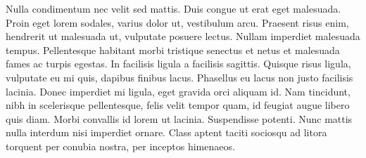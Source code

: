 \documentclass[
    colorlinks=true,        %
    linkcolor=black,          %
    anchorcolor=black,      %
    citecolor=black,         %
    urlcolor=black,          %
    bookmarks=true,         %
    bookmarksopen=false,    %
    bookmarksnumbered=true,  %
    dvipsnames
]{MAE}
\begin{document}
Nulla condimentum nec velit sed mattis. Duis congue ut erat eget malesuada. Proin eget lorem sodales, varius dolor ut, vestibulum arcu. Praesent risus enim, hendrerit ut malesuada ut, vulputate posuere lectus. Nullam imperdiet malesuada tempus. Pellentesque habitant morbi tristique senectus et netus et malesuada fames ac turpis egestas. In facilisis ligula a facilisis sagittis. Quisque risus ligula, vulputate eu mi quis, dapibus finibus lacus. Phasellus eu lacus non justo facilisis lacinia. Donec imperdiet mi ligula, eget gravida orci aliquam id. Nam tincidunt, nibh in scelerisque pellentesque, felis velit tempor quam, id feugiat augue libero quis diam. Morbi convallis id lorem ut lacinia. Suspendisse potenti. Nunc mattis nulla interdum nisi imperdiet ornare. Class aptent taciti sociosqu ad litora torquent per conubia nostra, per inceptos himenaeos.
\end{document}
